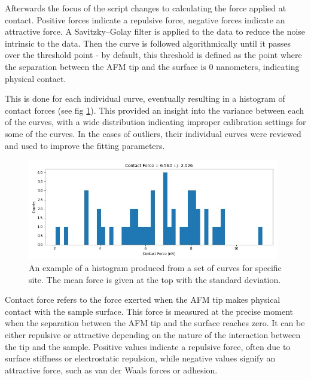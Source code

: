 
Afterwards the focus of the script changes to calculating the force applied at contact. Positive forces indicate a repulsive force, negative forces indicate an attractive force. A Savitzky--Golay filter is applied to the data to reduce the noise intrinsic to the data. \cite{SavitzkyGolay} Then the curve is followed algorithmically until it passes over the threshold point - by default, this threshold is defined as the point where the separation between the AFM tip and the surface is 0 nanometers, indicating physical contact.

This is done for each individual curve, eventually resulting in a histogram of contact forces (see fig \ref{fig:EgForceHisto}). This provided an insight into the variance between each of the curves, with a wide distribution indicating improper calibration settings for some of the curves. In the cases of outliers, their individual curves were reviewed and used to improve the fitting parameters.

\begin{figure}[h!!!] 
        \begin{center}
          \includegraphics[width=110mm]{chapter4/EgForceHisto.jpg}
\end{center}
\caption{An example of a histogram produced from a set of curves for specific site. The mean force is given at the top with the standard deviation.}
\label{fig:EgForceHisto}              
\end{figure}

Contact force refers to the force exerted when the AFM tip makes physical contact with the sample surface. This force is measured at the precise moment when the separation between the AFM tip and the surface reaches zero. It can be either repulsive or attractive depending on the nature of the interaction between the tip and the sample. Positive values indicate a repulsive force, often due to surface stiffness or electrostatic repulsion, while negative values signify an attractive force, such as van der Waals forces or adhesion.

